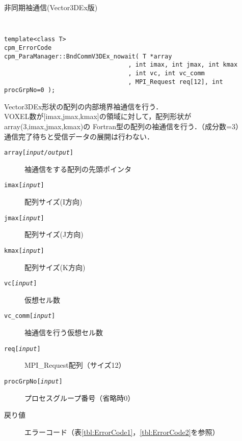 \begin{spacing}{0.8}
\begin{itembox}[l]{非同期袖通信(Vector3DEx版)}
{\tt
\begin{verbatim}
template<class T>
cpm_ErrorCode
cpm_ParaManager::BndCommV3DEx_nowait( T *array
                                  , int imax, int jmax, int kmax
                                  , int vc, int vc_comm
                                  , MPI_Request req[12], int procGrpNo=0 );
\end{verbatim}
}
Vector3DEx形状の配列の内部境界袖通信を行う．\\
VOXEL数が[imax,jmax,kmax]の領域に対して，配列形状がarray(3,imax,jmax,kmax)の
Fortran型の配列の袖通信を行う．（成分数=3）\\
通信完了待ちと受信データの展開は行わない．
\begin{description}
\item[{\tt array[{\it input/output}]}] 袖通信をする配列の先頭ポインタ
\item[{\tt imax[{\it input}]}] 配列サイズ(I方向)
\item[{\tt jmax[{\it input}]}] 配列サイズ(J方向)
\item[{\tt kmax[{\it input}]}] 配列サイズ(K方向)
\item[{\tt vc[{\it input}]}] 仮想セル数
\item[{\tt vc\_comm[{\it input}]}] 袖通信を行う仮想セル数
\item[{\tt req[{\it input}]}] MPI\_Request配列（サイズ12）
\item[{\tt procGrpNo[{\it input}]}] プロセスグループ番号（省略時0）
\\
\item[戻り値] エラーコード（表\ref{tbl:ErrorCode1}，\ref{tbl:ErrorCode2}を参照）
\end{description}
\end{itembox}\\
\end{spacing}

